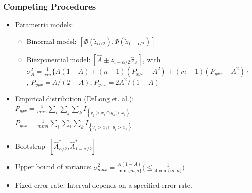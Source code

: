 \documentclass{beamer}
\begin{document}
\begin{frame}
\frametitle{Competing Procedures}

\begin{itemize}

    \item Parametric models:
    \begin{itemize}
        \item Binormal model: $[\Phi(\tilde{z}_{\alpha/2}), \Phi(\tilde{z}_{1-\alpha/2})]$
        \item Biexponential model: $[\hat{A} \pm  z_{1-\alpha/2} \hat{\sigma}_A]$, with \\
        $\sigma^2_A = \frac{1}{mn} \{ A(1 - A) + (n - 1)(P_{yyx} - A^2) + (m - 1)(P_{yxx} - A^2) \}$,
        $P_{yyx} = A/(2-A)$, $P_{yxx} = 2A^2/(1+A)$
    \end{itemize}

    \item Empirical distribution (DeLong et. al.): \\
    $P_{yyx} = \frac{1}{mnn} \sum_i \sum_j \sum_k I_{\left\{ y_j > x_i \cap y_k > x_i \right\}}$ \\
    $P_{yxx} = \frac{1}{mmn} \sum_i \sum_j \sum_k I_{\left\{ y_j > x_i \cap y_j > x_k \right\}}$

    \item Bootstrap: $[\hat{A}_{\alpha/2}^*, \hat{A}_{1-\alpha/2}^*]$

    \item Upper bound of variance: $\sigma^2_{max} = \frac{A(1-A)}{\min\{ m, n \}} \big( \leq \frac{1}{4 \min\{ m, n \} } \big) $

    \item Fixed error rate: Interval depends on a specified error rate.

\end{itemize}

\end{frame}

\end{document}
